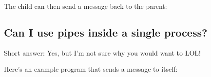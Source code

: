 \begin{Shaded}
\begin{Highlighting}[]
 \NormalTok{filedes[}\NormalTok{];}
 \NormalTok{) \{ }
     \NormalTok{buffer[}\NormalTok{];}
     \NormalTok{bytesread = read(filedes[}\NormalTok{], buffer, }
\NormalTok{\}}
\end{Highlighting}
\end{Shaded}

The child can then send a message back to the parent:

\begin{Shaded}
\begin{Highlighting}[]
 \NormalTok{) \{}
   \NormalTok{write(filedes[}\NormalTok{], }\NormalTok{, }\NormalTok{);}
\NormalTok{\}}
\end{Highlighting}
\end{Shaded}

\subsection{Can I use pipes inside a single
process?}\label{can-i-use-pipes-inside-a-single-process}

Short answer: Yes, but I'm not sure why you would want to LOL!

Here's an example program that sends a message to itself:

